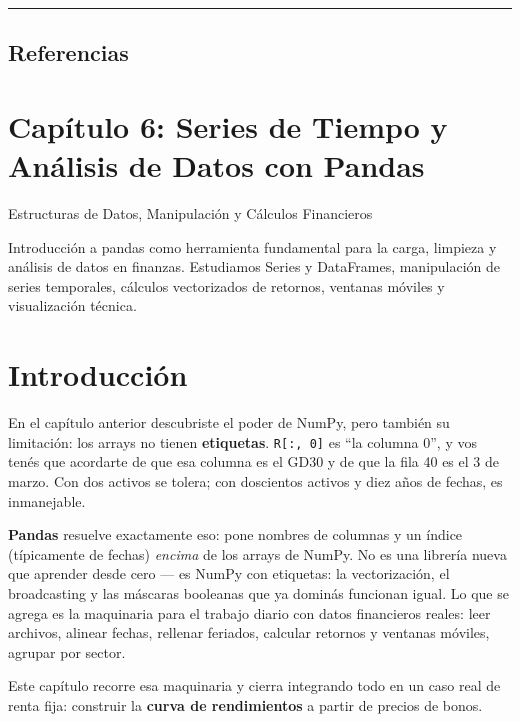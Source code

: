 \documentclass[
  spanish,
  letterpaper,
  DIV=11,
  numbers=noendperiod]{scrreprt}
\begin{document}
\begin{center}\rule{0.5\linewidth}{0.5pt}\end{center}

\section{Referencias}\label{referencias-4}

\label{refs}

\chapter{Capítulo 6: Series de Tiempo y Análisis de Datos con
Pandas}\label{capuxedtulo-6-series-de-tiempo-y-anuxe1lisis-de-datos-con-pandas}

Estructuras de Datos, Manipulación y Cálculos Financieros

Introducción a pandas como herramienta fundamental para la carga,
limpieza y análisis de datos en finanzas. Estudiamos Series y
DataFrames, manipulación de series temporales, cálculos vectorizados de
retornos, ventanas móviles y visualización técnica.

\hfill\break

\chapter*{Introducción}\label{introducciuxf3n-5}


En el capítulo anterior descubriste el poder de NumPy, pero también su
limitación: los arrays no tienen \textbf{etiquetas}.
\texttt{R{[}:,\ 0{]}} es ``la columna 0'', y vos tenés que acordarte de
que esa columna es el GD30 y de que la fila 40 es el 3 de marzo. Con dos
activos se tolera; con doscientos activos y diez años de fechas, es
inmanejable.

\textbf{Pandas} resuelve exactamente eso: pone nombres de columnas y un
índice (típicamente de fechas) \emph{encima} de los arrays de NumPy. No
es una librería nueva que aprender desde cero --- es NumPy con
etiquetas: la vectorización, el broadcasting y las máscaras booleanas
que ya dominás funcionan igual. Lo que se agrega es la maquinaria para
el trabajo diario con datos financieros reales: leer archivos, alinear
fechas, rellenar feriados, calcular retornos y ventanas móviles, agrupar
por sector.

Este capítulo recorre esa maquinaria y cierra integrando todo en un caso
real de renta fija: construir la \textbf{curva de rendimientos} a partir
de precios de bonos.
\end{document}
